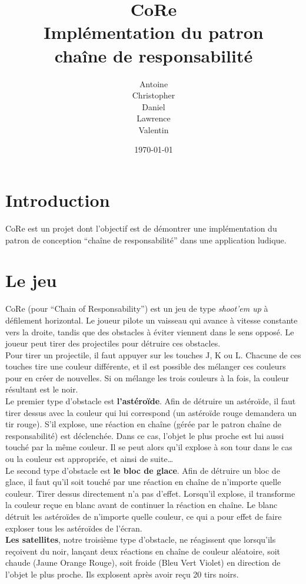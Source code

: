 \documentclass[11pt,a4paper,twoside,svgnames]{article}
\title{\color{Chocolate}\huge\bfseries CoRe\\Implémentation du patron\\chaîne de responsabilité}
\author{Antoine \bsc{Friant}\\
Christopher \bsc{Meier}\\
Daniel \bsc{Palumbo}\\
Lawrence \bsc{Stalder}\\
Valentin \bsc{Finini}}
\date{\today}
\begin{document}
\maketitle
\clearpage
\tableofcontents
\clearpage
\section{Introduction}
CoRe est un projet dont l'objectif est de démontrer une implémentation du patron de conception ``chaîne de responsabilité'' dans une application ludique.

\section{Le jeu}
CoRe (pour ``Chain of Responsability'') est un jeu de type \textit{shoot'em up} à défilement horizontal. Le joueur pilote un vaisseau qui avance à vitesse constante vers la droite, tandis que des obstacles à éviter viennent dans le sens opposé. Le joueur peut tirer des projectiles pour détruire ces obstacles.\\

Pour tirer un projectile, il faut appuyer sur les touches J, K ou L. Chacune de ces touches tire une couleur différente, et il est possible des mélanger ces couleurs pour en créer de nouvelles. Si on mélange les trois couleurs à la fois, la couleur résultant est le noir.\\

Le premier type d'obstacle est \textbf{l'astéroïde}. Afin de détruire un astéroïde, il faut tirer dessus avec la couleur qui lui correspond (un astéroïde rouge demandera un tir rouge). S'il explose, une réaction en chaîne (gérée par le patron chaîne de responsabilité) est déclenchée. Dans ce cas, l'objet le plus proche est lui aussi touché par la même couleur. Il se peut alors qu'il explose à son tour dans le cas ou la couleur est appropriée, et ainsi de suite\ldots\\

Le second type d'obstacle est \textbf{le bloc de glace}. Afin de détruire un bloc de glace, il faut qu'il soit touché par une réaction en chaîne de n'importe quelle couleur. Tirer dessus directement n'a pas d'effet. Lorsqu'il explose, il transforme la couleur reçue en blanc avant de continuer la réaction en chaîne. Le blanc détruit les astéroïdes de n'importe quelle couleur, ce qui a pour effet de faire exploser tous les astéroïdes de l'écran.\\

\textbf{Les satellites}, notre troisième type d'obstacle, ne réagissent que lorsqu'ils reçoivent du noir, lançant deux réactions en chaîne de couleur aléatoire, soit chaude (Jaune Orange Rouge), soit froide (Bleu Vert Violet) en direction de l'objet le plus proche. Ils explosent après avoir reçu 20 tirs noirs.\\
\end{document}

